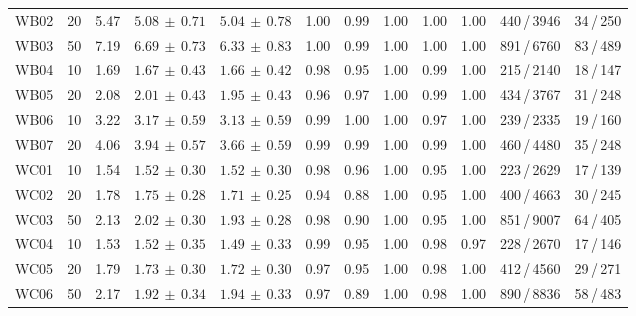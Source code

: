\begin{table}[htbp]
{\begin{tabular}{l r r r r r r r r r r r}
    WB02 & 20 & 5.47 & $5.08{\scriptstyle\,\pm\,0.71}$ & $5.04{\scriptstyle\,\pm\,0.78}$ & 1.00 & 0.99 & 1.00 & 1.00 & 1.00 & 440\,/\,3946 & 34\,/\,250 \\
    WB03 & 50 & 7.19 & $6.69{\scriptstyle\,\pm\,0.73}$ & $6.33{\scriptstyle\,\pm\,0.83}$ & 1.00 & 0.99 & 1.00 & 1.00 & 1.00 & 891\,/\,6760 & 83\,/\,489 \\
    WB04 & 10 & 1.69 & $1.67{\scriptstyle\,\pm\,0.43}$ & $1.66{\scriptstyle\,\pm\,0.42}$ & 0.98 & 0.95 & 1.00 & 0.99 & 1.00 & 215\,/\,2140 & 18\,/\,147 \\
    WB05 & 20 & 2.08 & $2.01{\scriptstyle\,\pm\,0.43}$ & $1.95{\scriptstyle\,\pm\,0.43}$ & 0.96 & 0.97 & 1.00 & 0.99 & 1.00 & 434\,/\,3767 & 31\,/\,248 \\
    WB06 & 10 & 3.22 & $3.17{\scriptstyle\,\pm\,0.59}$ & $3.13{\scriptstyle\,\pm\,0.59}$ & 0.99 & 1.00 & 1.00 & 0.97 & 1.00 & 239\,/\,2335 & 19\,/\,160 \\
    WB07 & 20 & 4.06 & $3.94{\scriptstyle\,\pm\,0.57}$ & $3.66{\scriptstyle\,\pm\,0.59}$ & 0.99 & 0.99 & 1.00 & 0.99 & 1.00 & 460\,/\,4480 & 35\,/\,248 \\
    \addlinespace
    WC01 & 10 & 1.54 & $1.52{\scriptstyle\,\pm\,0.30}$ & $1.52{\scriptstyle\,\pm\,0.30}$ & 0.98 & 0.96 & 1.00 & 0.95 & 1.00 & 223\,/\,2629 & 17\,/\,139 \\
    WC02 & 20 & 1.78 & $1.75{\scriptstyle\,\pm\,0.28}$ & $1.71{\scriptstyle\,\pm\,0.25}$ & 0.94 & 0.88 & 1.00 & 0.95 & 1.00 & 400\,/\,4663 & 30\,/\,245 \\
    WC03 & 50 & 2.13 & $2.02{\scriptstyle\,\pm\,0.30}$ & $1.93{\scriptstyle\,\pm\,0.28}$ & 0.98 & 0.90 & 1.00 & 0.95 & 1.00 & 851\,/\,9007 & 64\,/\,405 \\
    WC04 & 10 & 1.53 & $1.52{\scriptstyle\,\pm\,0.35}$ & $1.49{\scriptstyle\,\pm\,0.33}$ & 0.99 & 0.95 & 1.00 & 0.98 & 0.97 & 228\,/\,2670 & 17\,/\,146 \\
    WC05 & 20 & 1.79 & $1.73{\scriptstyle\,\pm\,0.30}$ & $1.72{\scriptstyle\,\pm\,0.30}$ & 0.97 & 0.95 & 1.00 & 0.98 & 1.00 & 412\,/\,4560 & 29\,/\,271 \\
    WC06 & 50 & 2.17 & $1.92{\scriptstyle\,\pm\,0.34}$ & $1.94{\scriptstyle\,\pm\,0.33}$ & 0.97 & 0.89 & 1.00 & 0.98 & 1.00 & 890\,/\,8836 & 58\,/\,483 \\
    \bottomrule
  \end{tabular}%
  }
\end{table}

